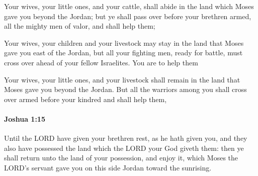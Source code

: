			\begin{versebox}
					\item[BHS] 
					\item[ASV] Your wives, your little ones, and your cattle, shall abide in the land which Moses gave you beyond the Jordan; but ye shall pass over before your brethren armed, all the mighty men of valor, and shall help them;
					\item[NIV] Your wives, your children and your livestock may stay in the land that Moses gave you east of the Jordan, but all your fighting men, ready for battle, must cross over ahead of your fellow Israelites. You are to help them
					\item[NRSV] Your wives, your little ones, and your livestock shall remain in the land that Moses gave you beyond the Jordan. But all the warriors among you shall cross over armed before your kindred and shall help them,
			\end{versebox}

		\paragraph{Joshua 1:15} %
			\label{JOSHUA-1-15}

			Until the LORD have given your brethren rest, as he hath given you, and they also have possessed the land which the LORD your God giveth them: then ye shall return unto the land of your possession, and enjoy it, which Moses the LORD’s servant gave you on this side Jordan toward the sunrising.

